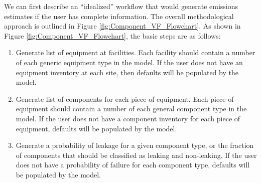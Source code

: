 \documentclass[11pt]{report}
\begin{document}
{{{{We can first describe an ``idealized'' workflow that would generate emissions estimates if the user has complete information. The overall methodological approach is outlined in Figure \ref{fig:Component_VF_Flowchart}.  As shown in Figure \ref{fig:Component_VF_Flowchart}, the basic steps are as follows:
\begin{enumerate}
\item Generate list of equipment at facilities. Each facility should contain a number of each generic equipment type in the model. If the user does not have an equipment inventory at each site, then defaults will be populated by the model.
\item Generate list of components for each piece of equipment. Each piece of equipment should contain a number of each general component type in the model. If the user does not have a component inventory for each piece of equipment, defaults will be populated by the model.
\item Generate a probability of leakage for a given component type, or the fraction of components that should be classified as leaking and non-leaking. If the user does not have a probability of failure for each component type, defaults will be populated by the model.


\end{enumerate}}}}}
\end{document}
